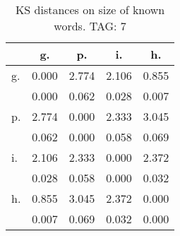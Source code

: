 \begin{table}[h!]
\begin{center}
\begin{tabular}{| l | c | c | c | c |}\hline
 & g. & p. & i. & h. \\\hline
g. & 0.000  & 2.774  & 2.106  & 0.855 \\\hline
 & 0.000  & 0.062  & 0.028  & 0.007 \\\hline
p. & 2.774  & 0.000  & 2.333  & 3.045 \\\hline
 & 0.062  & 0.000  & 0.058  & 0.069 \\\hline
i. & 2.106  & 2.333  & 0.000  & 2.372 \\\hline
 & 0.028  & 0.058  & 0.000  & 0.032 \\\hline
h. & 0.855  & 3.045  & 2.372  & 0.000 \\\hline
 & 0.007  & 0.069  & 0.032  & 0.000 \\\hline
\end{tabular}
\caption{KS distances on size of known words. TAG: 7}
\end{center}
\end{table}
